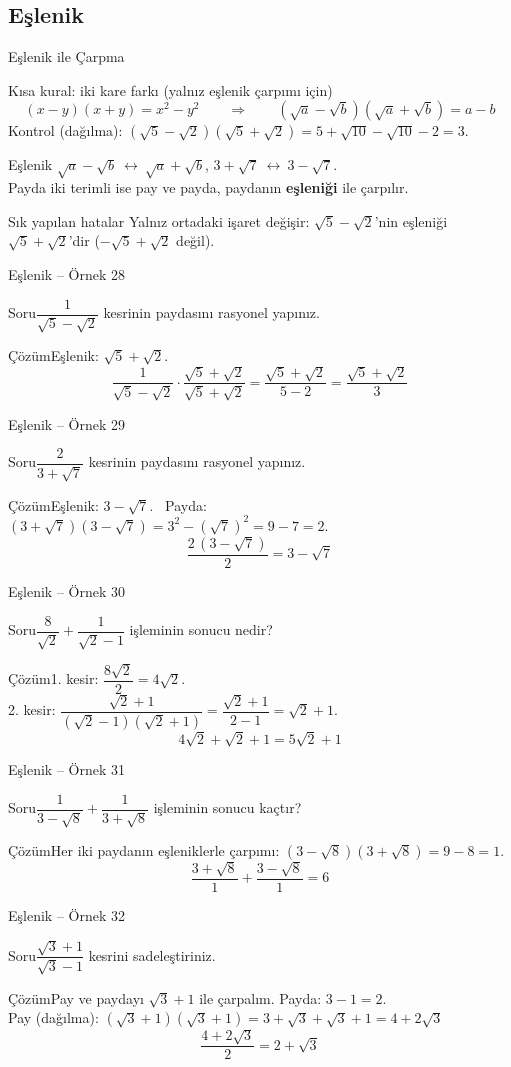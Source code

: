 \documentclass[aspectratio=169,11pt]{beamer}
\newcommand{\soru}[3]{%
\begin{frame}{#1}
  \begin{block}{Soru}\large #2\end{block}
  \pause
  \begin{exampleblock}{Çözüm}\large #3\end{exampleblock}
\end{frame}}
\begin{document}
\subsection{Eşlenik}
\begin{frame}{Eşlenik ile Çarpma}
\begin{block}{Kısa kural: iki kare farkı (yalnız eşlenik çarpımı için)}
\[(x-y)(x+y)=x^2-y^2\qquad\Rightarrow\qquad (\sqrt a-\sqrt b)(\sqrt a+\sqrt b)=a-b\]
Kontrol (dağılma): \((\sqrt5-\sqrt2)(\sqrt5+\sqrt2)=5+\sqrt{10}-\sqrt{10}-2=3\).
\end{block}
\begin{block}{Eşlenik}
\(\sqrt a-\sqrt b\ \leftrightarrow\ \sqrt a+\sqrt b\), \qquad \(3+\sqrt7\ \leftrightarrow\ 3-\sqrt7\).\\
Payda iki terimli ise pay ve payda, paydanın \textbf{eşleniği} ile çarpılır.
\end{block}
\begin{alertblock}{Sık yapılan hatalar}
Yalnız ortadaki işaret değişir: \(\sqrt5-\sqrt2\)'nin eşleniği \(\sqrt5+\sqrt2\)'dir (\(-\sqrt5+\sqrt2\) değil).
\end{alertblock}
\end{frame}

\soru{Eşlenik -- Örnek 28}
{\(\dfrac{1}{\sqrt5-\sqrt2}\) kesrinin paydasını rasyonel yapınız.}
{Eşlenik: \(\sqrt5+\sqrt2\).
\[\frac{1}{\sqrt5-\sqrt2}\cdot\frac{\sqrt5+\sqrt2}{\sqrt5+\sqrt2}=\frac{\sqrt5+\sqrt2}{5-2}=\frac{\sqrt5+\sqrt2}{3}\]}

\soru{Eşlenik -- Örnek 29}
{\(\dfrac{2}{3+\sqrt7}\) kesrinin paydasını rasyonel yapınız.}
{Eşlenik: \(3-\sqrt7\). \ Payda: \((3+\sqrt7)(3-\sqrt7)=3^2-(\sqrt7)^2=9-7=2\).
\[\frac{2\,(3-\sqrt7)}{2}=3-\sqrt7\]}

\soru{Eşlenik -- Örnek 30}
{\(\dfrac{8}{\sqrt2}+\dfrac{1}{\sqrt2-1}\) işleminin sonucu nedir?}
{1. kesir: \(\dfrac{8\sqrt2}{2}=4\sqrt2\).\\[3pt]
2. kesir: \(\dfrac{\sqrt2+1}{(\sqrt2-1)(\sqrt2+1)}=\dfrac{\sqrt2+1}{2-1}=\sqrt2+1\).
\[4\sqrt2+\sqrt2+1=5\sqrt2+1\]}

\soru{Eşlenik -- Örnek 31}
{\(\dfrac{1}{3-\sqrt8}+\dfrac{1}{3+\sqrt8}\) işleminin sonucu kaçtır?}
{Her iki paydanın eşleniklerle çarpımı: \((3-\sqrt8)(3+\sqrt8)=9-8=1\).
\[\frac{3+\sqrt8}{1}+\frac{3-\sqrt8}{1}=6\]}

\soru{Eşlenik -- Örnek 32}
{\(\dfrac{\sqrt3+1}{\sqrt3-1}\) kesrini sadeleştiriniz.}
{Pay ve paydayı \(\sqrt3+1\) ile çarpalım. Payda: \(3-1=2\).\\[3pt]
Pay (dağılma): \((\sqrt3+1)(\sqrt3+1)=3+\sqrt3+\sqrt3+1=4+2\sqrt3\)
\[\frac{4+2\sqrt3}{2}=2+\sqrt3\]}
\end{document}
